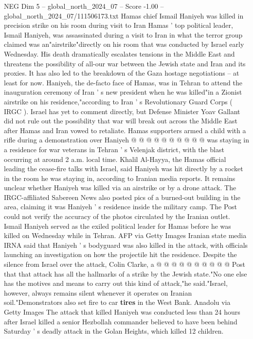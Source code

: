 \begin{textsample}{NEG Dim 5 – global\_north\_2024\_07 – Score -1.00 – global\_north\_2024\_07/111506173.txt}  \label{ex:f5_neg_158}
Hamas chief Ismail Haniyeh was killed in precision strike on his room during visit to Iran Hamas ' top political leader, Ismail Haniyeh, was assassinated during a visit to Iran in what the terror group claimed was an"airstrike"directly on his room that was conducted by Israel early Wednesday.
His death dramatically escalates tensions in the Middle East and threatens the possibility of all-our war between the Jewish state and Iran and its proxies.
It has also led to the breakdown of the Gaza hostage negotiations -- at least for now.
Haniyeh, the de-facto face of Hamas, was in Tehran to attend the inauguration ceremony of Iran ' s new president when he was killed"in a Zionist airstrike on his residence,"according to Iran ' s Revolutionary Guard Corps ( IRGC ).
Israel has yet to comment directly, but Defense Minister Yoav Gallant did not rule out the possibility that war will break out across the Middle East after Hamas and Iran vowed to retaliate.
Hamas supporters armed a child with a rifle during a demonstration over Haniyeh @ @ @ @ @ @ @ @ @ @ was staying in a residence for war veterans in Tehran ' s Velenjak district, with the blast occurring at around 2 a.m. local time.
Khalil Al-Hayya, the Hamas official leading the cease-fire talks with Israel, said Haniyeh was hit directly by a rocket in the room he was staying in, according to Iranian media reports.
It remains unclear whether Haniyeh was killed via an airstrike or by a drone attack.
The IRGC-affiliated Sabereen News also posted pics of a burned-out building in the area, claiming it was Haniyeh ' s residence inside the military camp.
The Post could not verify the accuracy of the photos circulated by the Iranian outlet.
Ismail Haniyeh served as the exiled political leader for Hamas before he was killed on Wednesday while in Tehran.
AFP via Getty Images Iranian state media IRNA said that Haniyeh ' s bodyguard was also killed in the attack, with officials launching an investigation on how the projectile hit the residence.
Despite the silence from Israel over the attack, Colin Clarke, a @ @ @ @ @ @ @ @ @ @ Post that that attack has all the hallmarks of a strike by the Jewish state."No one else has the motives and means to carry out this kind of attack,"he said."Israel, however, always remains silent whenever it operates on Iranian soil."Demonstrators also set fire to car \textbf{tires} in the West Bank.
Anadolu via Getty Images The attack that killed Haniyeh was conducted less than 24 hours after Israel killed a senior Hezbollah commander believed to have been behind Saturday ' s deadly attack in the Golan Heights, which killed 12 children.

\end{textsample}
